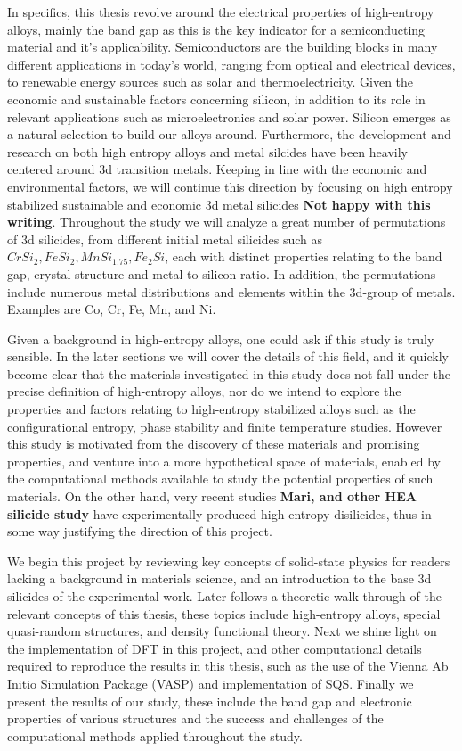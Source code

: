 \documentclass[UKenglish]{ifimaster}  %
\begin{document}
In specifics, this thesis revolve around the electrical properties of high-entropy alloys, mainly the band gap as this is the key indicator for a semiconducting material and it's applicability. Semiconductors are the building blocks in many different applications in today's world, ranging from  optical and electrical devices, to renewable energy sources such as solar and thermoelectricity. Given the economic and sustainable factors concerning silicon, in addition to its role in relevant applications such as microelectronics and solar power. Silicon emerges as a natural selection to build our alloys around. Furthermore, the development and research on both high entropy alloys and metal silcides have been heavily centered around 3d transition metals. Keeping in line with the economic and environmental factors, we will continue this direction by focusing on high entropy stabilized sustainable and economic 3d metal silicides \textbf{Not happy with this writing}. Throughout the study we will analyze a great number of permutations of 3d silicides, from different initial metal silicides such as $CrSi_2, FeSi_2, MnSi_{1.75}, Fe_2Si$, each with distinct properties relating to the band gap, crystal structure and metal to silicon ratio. In addition, the permutations include numerous metal distributions and elements within the 3d-group of metals. Examples are Co, Cr, Fe, Mn, and Ni. 

Given a background in high-entropy alloys, one could ask if this study is truly sensible. In the later sections we will cover the details of this field, and it quickly become clear that the materials investigated in this study does not fall under the precise definition of high-entropy alloys, nor do we intend to explore the properties and factors relating to high-entropy stabilized alloys such as the configurational entropy, phase stability and finite temperature studies. However this study is motivated from the discovery of these materials and promising properties, and venture into a more hypothetical space of materials, enabled by the computational methods available to study the potential properties of such materials. On the other hand, very recent studies \textbf{Mari, and other HEA silicide study} have experimentally produced high-entropy disilicides, thus in some way justifying the direction of this project. 

We begin this project by reviewing key concepts of solid-state physics for readers lacking a background in materials science, and an introduction to the base 3d silicides of the experimental work. Later follows a theoretic walk-through of the relevant concepts of this thesis, these topics include high-entropy alloys, special quasi-random structures, and density functional theory. Next we shine light on the implementation of DFT in this project, and other computational details required to reproduce the results in this thesis, such as the use of the Vienna Ab Initio Simulation Package (VASP) and implementation of SQS. Finally we present the results of our study, these include the band gap and electronic properties of various structures and the success and challenges of the computational methods applied throughout the study. 
\end{document}
